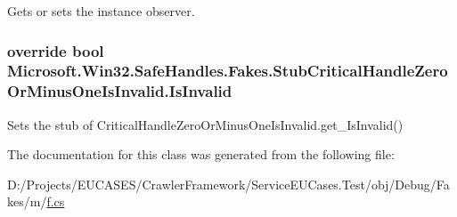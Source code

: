 Gets or sets the instance observer.

\hypertarget{class_microsoft_1_1_win32_1_1_safe_handles_1_1_fakes_1_1_stub_critical_handle_zero_or_minus_one_is_invalid_a2f8f0b9f670419660dd397e7bb0a6074}{
\subsubsection[{Is\-Invalid}]{\setlength{\rightskip}{0pt plus 5cm}override bool Microsoft.\-Win32.\-Safe\-Handles.\-Fakes.\-Stub\-Critical\-Handle\-Zero\-Or\-Minus\-One\-Is\-Invalid.\-Is\-Invalid\hspace{0.3cm}{\ttfamily [get]}}}\label{class_microsoft_1_1_win32_1_1_safe_handles_1_1_fakes_1_1_stub_critical_handle_zero_or_minus_one_is_invalid_a2f8f0b9f670419660dd397e7bb0a6074}


Sets the stub of Critical\-Handle\-Zero\-Or\-Minus\-One\-Is\-Invalid.\-get\-\_\-\-Is\-Invalid()



The documentation for this class was generated from the following file\-:\begin{DoxyCompactItemize}
\item 
D\-:/\-Projects/\-E\-U\-C\-A\-S\-E\-S/\-Crawler\-Framework/\-Service\-E\-U\-Cases.\-Test/obj/\-Debug/\-Fakes/m/\hyperlink{m_2f_8cs}{f.\-cs}\end{DoxyCompactItemize}
